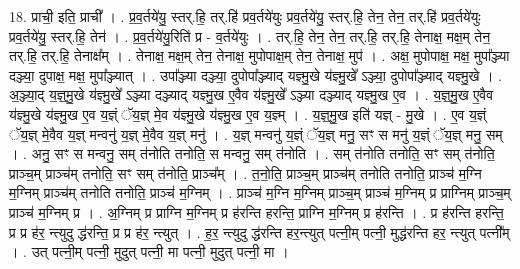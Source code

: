 \documentclass[17pt]{extarticle}
\begin{document}
18. प्राची॒ इति॒ प्राची᳚ । . प्र॒व॒र्तये॑यु॒ स्तर्.हि॒ तर्.हि॑ प्रव॒र्तये॑युः प्रव॒र्तये॑यु॒ स्तर्.हि॒ तेन॒ तेन॒ तर्.हि॑ प्रव॒र्तये॑युः प्रव॒र्तये॑यु॒ स्तर्.हि॒ तेन॑ । . प्र॒व॒र्तये॑यु॒रिति॑ प्र - व॒र्तये॑युः । . तर्.हि॒ तेन॒ तेन॒ तर्.हि॒ तर्.हि॒ तेनाक्ष॒ मक्ष॒म् तेन॒ तर्.हि॒ तर्.हि॒ तेनाक्ष᳚म् । . तेनाक्ष॒ मक्ष॒म् तेन॒ तेनाक्ष॒ मुपोपाक्ष॒म् तेन॒ तेनाक्ष॒ मुप॑ । . अक्ष॒ मुपोपाक्ष॒ मक्ष॒ मुपा᳚ञ्ज्या दञ्ज्या॒ दुपाक्ष॒ मक्ष॒ मुपा᳚ञ्ज्यात् । . उपा᳚ञ्ज्या दञ्ज्या॒ दुपोपा᳚ञ्ज्याद् यज्ञ्मु॒खे य॑ज्ञ्मु॒खे᳚ ऽञ्ज्या॒ दुपोपा᳚ञ्ज्याद् यज्ञ्मु॒खे । . अ॒ञ्ज्या॒द् य॒ज्ञ्॒मु॒खे य॑ज्ञ्मु॒खे᳚ ऽञ्ज्या दञ्ज्याद् यज्ञ्मु॒ख ए॒वैव य॑ज्ञ्मु॒खे᳚ ऽञ्ज्या दञ्ज्याद् यज्ञ्मु॒ख ए॒व । . य॒ज्ञ्॒मु॒ख ए॒वैव य॑ज्ञ्मु॒खे य॑ज्ञ्मु॒ख ए॒व य॒ज्ञ्ं ॅय॒ज्ञ् मे॒व य॑ज्ञ्मु॒खे य॑ज्ञ्मु॒ख ए॒व य॒ज्ञ्म् । . य॒ज्ञ्॒मु॒ख इति॑ यज्ञ् - मु॒खे । . ए॒व य॒ज्ञ्ं ॅय॒ज्ञ् मे॒वैव य॒ज्ञ् मन्वनु॑ य॒ज्ञ् मे॒वैव य॒ज्ञ् मनु॑ । . य॒ज्ञ् मन्वनु॑ य॒ज्ञ्ं ॅय॒ज्ञ् मनु॒ सꣳ स मनु॑ य॒ज्ञ्ं ॅय॒ज्ञ् मनु॒ सम् । . अनु॒ सꣳ स मन्वनु॒ सम् त॑नोति तनोति॒ स मन्वनु॒ सम् त॑नोति । . सम् त॑नोति तनोति॒ सꣳ सम् त॑नोति॒ प्राञ्च॒म् प्राञ्च॑म् तनोति॒ सꣳ सम् त॑नोति॒ प्राञ्च᳚म् । . त॒नो॒ति॒ प्राञ्च॒म् प्राञ्च॑म् तनोति तनोति॒ प्राञ्च॑ म॒ग्नि म॒ग्निम् प्राञ्च॑म् तनोति तनोति॒ प्राञ्च॑ म॒ग्निम् । . प्राञ्च॑ म॒ग्नि म॒ग्निम् प्राञ्च॒म् प्राञ्च॑ म॒ग्निम् प्र प्राग्निम् प्राञ्च॒म् प्राञ्च॑ म॒ग्निम् प्र । . अ॒ग्निम् प्र प्राग्नि म॒ग्निम् प्र ह॑रन्ति हरन्ति॒ प्राग्नि म॒ग्निम् प्र ह॑रन्ति । . प्र ह॑रन्ति हरन्ति॒ प्र प्र ह॑र॒ न्त्युदु द्ध॑रन्ति॒ प्र प्र ह॑र॒ न्त्युत् । . ह॒र॒ न्त्युदु द्ध॑रन्ति हर॒न्त्युत् पत्नी॒म् पत्नी॒ मुद्ध॑रन्ति हर॒ न्त्युत् पत्नी᳚म् । . उत् पत्नी॒म् पत्नी॒ मुदुत् पत्नी॒ मा पत्नी॒ मुदुत् पत्नी॒ मा । \newline
\end{document}
